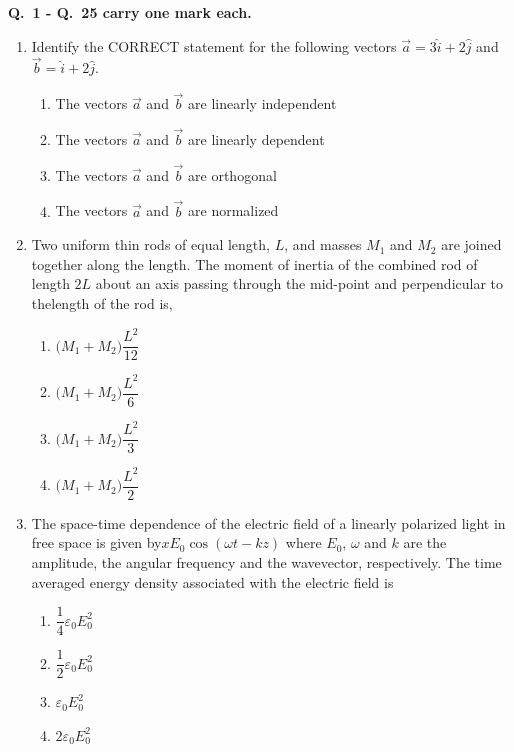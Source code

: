 \documentclass[journal,12pt,onecolumn]{IEEEtran}
\theoremstyle{remark}
\begin{document}
\vspace{1mm}

\textbf{Q.\ 1 - Q.\ 25 carry one mark each.}


\begin{enumerate}
\item Identify the CORRECT statement for the following vectors
$\vec{a}=3\hat{i}+2\hat{j}$ and $\vec{b}=\hat{i}+2\hat{j}$.
\hfill{}
\begin{enumerate}
\item The vectors $\vec{a}$ and $\vec{b}$ are linearly independent
\item The vectors $\vec{a}$ and $\vec{b}$ are linearly dependent
\item The vectors $\vec{a}$ and $\vec{b}$ are orthogonal
\item The vectors $\vec{a}$ and $\vec{b}$ are normalized
\end{enumerate}

\item Two uniform thin rods of equal length, $L$, and masses $M_1$ and $M_2$ are joined together along the length. The moment of inertia of the combined rod of length $2L$ about an axis passing through the mid-point and perpendicular to thelength of the rod is,
\begin{multicols}{2}
\begin{enumerate}
\item $\bigl(M_1+M_2\bigr)\dfrac{L^{2}}{12}$
\item $\bigl(M_1+M_2\bigr)\dfrac{L^{2}}{6}$
\item $\bigl(M_1+M_2\bigr)\dfrac{L^{2}}{3}$
\item $\bigl(M_1+M_2\bigr)\dfrac{L^{2}}{2}$
\end{enumerate}
\end{multicols}

\item The space-time dependence of the electric field of a linearly polarized light in free space is given by$xE_{0}\cos(\omega t-kz)$ where $E_{0}$, $\omega$ and $k$ are the
amplitude, the angular frequency and the wavevector, respectively. The time averaged energy density associated with the electric field is
\begin{multicols}{4}
\begin{enumerate}
\item $\dfrac{1}{4}\varepsilon_{0}E_{0}^{2}$
\item $\dfrac{1}{2}\varepsilon_{0}E_{0}^{2}$
\item $\varepsilon_{0}E_{0}^{2}$
\item $2\varepsilon_{0}E_{0}^{2}$
\end{enumerate}
\end{multicols}


\end{enumerate}
\end{document}
